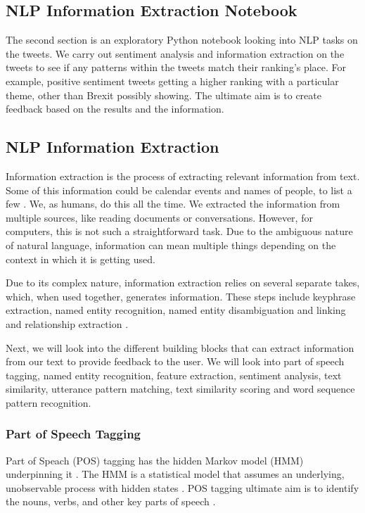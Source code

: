 	\subsection{NLP Information Extraction Notebook}
	
	The second section is an exploratory Python notebook looking into NLP tasks on the tweets. We carry out sentiment analysis and information extraction on the tweets to see if any patterns within the tweets match their ranking's place. For example, positive sentiment tweets getting a higher ranking with a particular theme, other than Brexit possibly showing. The ultimate aim is to create feedback based on the results and the information. %
	
	\subsection{NLP Information Extraction}
	\label{meth:nlp_IE}
	Information extraction is the process of extracting relevant information from text. Some of this information could be calendar events and names of people, to list a few \cite{vajjala2020practical}. We, as humans, do this all the time. We extracted the information from multiple sources, like reading documents or conversations. However, for computers, this is not such a straightforward task. Due to the ambiguous nature of natural language, information can mean multiple things depending on the context in which it is getting used.
	
	Due to its complex nature, information extraction relies on several separate takes, which, when used together, generates information. These steps include keyphrase extraction, named entity recognition, named entity disambiguation and linking and relationship extraction \cite{vajjala2020practical}.
	
	Next, we will look into the different building blocks that can extract information from our text to provide feedback to the user. We will look into part of speech tagging, named entity recognition, feature extraction, sentiment analysis, text similarity, utterance pattern matching, text similarity scoring and word sequence pattern recognition.
	
	\subsubsection{Part of Speech Tagging}
	Part of Speach (POS) tagging has the hidden Markov model (HMM) underpinning it \cite{vajjala2020practical}. The HMM is a statistical model that assumes an underlying, unobservable process with hidden states \cite{baum1966statistical}. POS tagging ultimate aim is to identify the nouns, verbs, and other key parts of speech \cite{vasiliev2020natural}.
	
